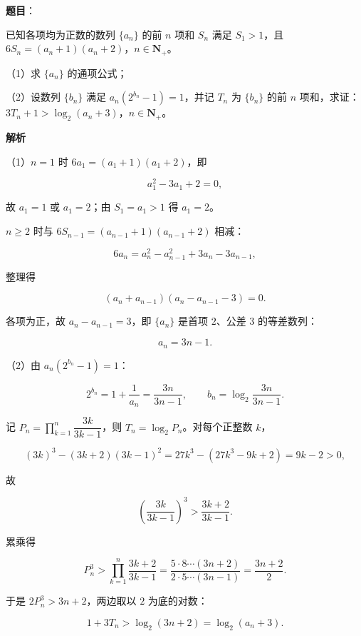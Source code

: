 \begin{answer}

\textbf{题目}：

已知各项均为正数的数列 $\{a_n\}$ 的前 $n$ 项和 $S_n$ 满足 $S_1>1$，且 $6S_n=(a_n+1)(a_n+2)$，$n\in\mathbf N_+$。

（1）求 $\{a_n\}$ 的通项公式；

（2）设数列 $\{b_n\}$ 满足 $a_n(2^{b_n}-1)=1$，并记 $T_n$ 为 $\{b_n\}$ 的前 $n$ 项和，求证：$3T_n+1>\log_2(a_n+3)$，$n\in\mathbf N_+$。

\textbf{解析}

（1）$n=1$ 时 $6a_1=(a_1+1)(a_1+2)$，即

\nopagebreak[4]
\[a_1^2-3a_1+2=0,\]

故 $a_1=1$ 或 $a_1=2$；由 $S_1=a_1>1$ 得 $a_1=2$。

$n\geqslant2$ 时与 $6S_{n-1}=(a_{n-1}+1)(a_{n-1}+2)$ 相减：

\nopagebreak[4]
\[6a_n=a_n^2-a_{n-1}^2+3a_n-3a_{n-1},\]

整理得

\nopagebreak[4]
\[(a_n+a_{n-1})(a_n-a_{n-1}-3)=0.\]

各项为正，故 $a_n-a_{n-1}=3$，即 $\{a_n\}$ 是首项 $2$、公差 $3$ 的等差数列：

\nopagebreak[4]
\[a_n=3n-1.\]

（2）由 $a_n(2^{b_n}-1)=1$：

\nopagebreak[4]
\[2^{b_n}=1+\frac1{a_n}=\frac{3n}{3n-1},\qquad b_n=\log_2\frac{3n}{3n-1}.\]

记 $P_n=\prod\limits_{k=1}^n\dfrac{3k}{3k-1}$，则 $T_n=\log_2P_n$。对每个正整数 $k$，

\nopagebreak[4]
\[(3k)^3-(3k+2)(3k-1)^2=27k^3-(27k^3-9k+2)=9k-2>0,\]

故

\nopagebreak[4]
\[\left(\frac{3k}{3k-1}\right)^3>\frac{3k+2}{3k-1}.\]

累乘得

\nopagebreak[4]
\[P_n^3>\prod_{k=1}^n\frac{3k+2}{3k-1}=\frac{5\cdot8\cdots(3n+2)}{2\cdot5\cdots(3n-1)}=\frac{3n+2}2.\]

于是 $2P_n^3>3n+2$，两边取以 $2$ 为底的对数：

\nopagebreak[4]
\[1+3T_n>\log_2(3n+2)=\log_2(a_n+3).\]


\end{answer}
